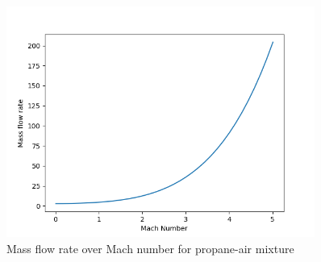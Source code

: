 \documentclass[a4paper,11pt]{article}
\begin{document}
	\begin{figure}[H]
		\centering
		\includegraphics[width=0.9\textwidth]{propan_pow(1mol)/Mass_flow_rate_over_Mach.png}
       		\caption{Mass flow rate over Mach number for propane-air mixture}
	\end{figure}
\end{document}
